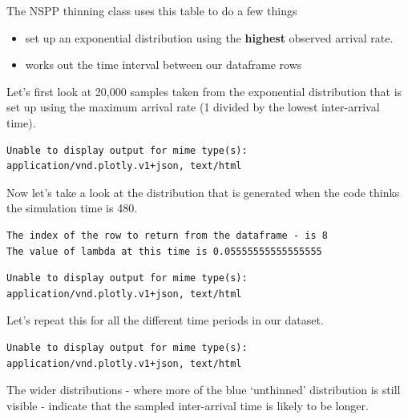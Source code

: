 \documentclass[
  letterpaper,
  DIV=11,
  numbers=noendperiod]{scrreprt}
\providecommand{\tightlist}{%
  \setlength{\itemsep}{0pt}\setlength{\parskip}{0pt}}\usepackage{longtable,booktabs,array}
\begin{document}
\begin{tcolorbox}[enhanced jigsaw, colframe=quarto-callout-note-color-frame, bottomtitle=1mm, breakable, rightrule=.15mm, coltitle=black, colbacktitle=quarto-callout-note-color!10!white, opacityback=0, leftrule=.75mm, arc=.35mm, toptitle=1mm, title=\textcolor{quarto-callout-note-color}{\faInfo}\hspace{0.5em}{Click here for a more in-depth breakdown about how the NSPPThinning
class works under the hood}, titlerule=0mm, colback=white, toprule=.15mm, bottomrule=.15mm, left=2mm, opacitybacktitle=0.6]

The NSPP thinning class uses this table to do a few things

\begin{itemize}
\tightlist
\item
  set up an exponential distribution using the \textbf{highest} observed
  arrival rate.
\item
  works out the time interval between our dataframe rows
\end{itemize}

Let's first look at 20,000 samples taken from the exponential
distribution that is set up using the maximum arrival rate (1 divided by
the lowest inter-arrival time).

\begin{verbatim}
Unable to display output for mime type(s): application/vnd.plotly.v1+json, text/html
\end{verbatim}

Now let's take a look at the distribution that is generated when the
code thinks the simulation time is 480.

\begin{verbatim}
The index of the row to return from the dataframe - is 8
The value of lambda at this time is 0.05555555555555555
\end{verbatim}

\begin{verbatim}
Unable to display output for mime type(s): application/vnd.plotly.v1+json, text/html
\end{verbatim}

Let's repeat this for all the different time periods in our dataset.

\begin{verbatim}
Unable to display output for mime type(s): application/vnd.plotly.v1+json, text/html
\end{verbatim}

The wider distributions - where more of the blue `unthinned'
distribution is still visible - indicate that the sampled inter-arrival
time is likely to be longer.

\end{tcolorbox}
\end{document}
